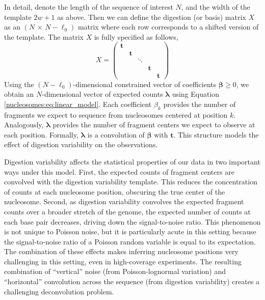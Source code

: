 In detail, denote the length of the sequence of interest $N$, and the width of the template $2w+1$ as above.
%
Then we can define the digestion (or basis) matrix $X$ as an $(N\,\times\,N - \ell_0)$ matrix where each row corresponds to a shifted version of the template.
The matrix $X$ is fully specified as follows,
\begin{equation}
	X = \begin{pmatrix}
	     \bm{t} &&&& \\
	     & \bm{t} &&& \\
	     && \ddots && \\
	     &&& \bm{t} &\\
	     &&&& \bm{t}
	    \end{pmatrix}
\end{equation}
%
Using the $(N - \ell_0)$-dimensional constrained vector of coefficients $\bm
\beta \geq 0$, we obtain an $N$-dimensional vector of expected counts $\bm
\lambda$ using Equation \ref{nucleosomes:eq:linear_model}.
%
Each coefficient $\beta_k$ provides the number of fragments we expect to sequence from nucleosomes centered at position $k$.
%
Analogously, $\bm \lambda$ provides the number of fragment centers we expect to observe at each position.
Formally, $\bm \lambda$ is a convolution of $\bm \beta$ with $\bm t$.
This structure models the effect of digestion variability on the observations.

Digestion variability affects the statistical properties of our data in two important ways under this model.
%
First, the expected counts of fragment centers are convolved with the digestion variability template.
This reduces the concentration of counts at each nucleosome position, obscuring the true center of the nucleosome.
%
Second, as digestion variability convolves the expected fragment counts over a broader stretch of the genome, the expected number of counts at each base pair decreases, driving down the signal-to-noise ratio.
This phenomenon is not unique to Poisson noise, but it is particularly acute in this setting because the signal-to-noise ratio of a Poisson random variable is equal to its expectation.
%
The combination of these effects makes inferring nucleosome positions very challenging in this setting, even in high-coverage experiments.
The resulting combination of ``vertical'' noise (from Poisson-lognormal variation) and ``horizontal'' convolution across the sequence (from digestion variability) creates a challenging deconvolution problem.



